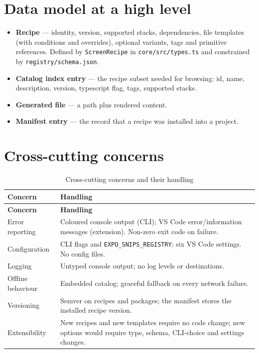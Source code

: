 \section{Data model at a high level}

\begin{itemize}
  \item \textbf{Recipe} --- identity, version, supported stacks, dependencies,
        file templates (with conditions and overrides), optional variants, tags and
        primitive references. Defined by \texttt{ScreenRecipe} in
        \texttt{core/src/types.ts} and constrained by \texttt{registry/schema.json}.
  \item \textbf{Catalog index entry} --- the recipe subset needed for browsing:
        id, name, description, version, typescript flag, tags, supported stacks.
  \item \textbf{Generated file} --- a path plus rendered content.
  \item \textbf{Manifest entry} --- the record that a recipe was installed into a
        project.
\end{itemize}

\section{Cross-cutting concerns}

\begin{longtable}{@{}L{3.6cm}L{10.4cm}@{}}
\caption{Cross-cutting concerns and their handling}\\
\toprule
\textbf{Concern} & \textbf{Handling} \\
\midrule
\endfirsthead
\toprule
\textbf{Concern} & \textbf{Handling} \\
\midrule
\endhead
Error reporting & Coloured console output (CLI); VS Code error/information messages (extension). Non-zero exit code on failure. \\
Configuration & CLI flags and \texttt{EXPO\_SNIPS\_REGISTRY}; six VS Code settings. No config files. \\
Logging & Untyped console output; no log levels or destinations. \\
Offline behaviour & Embedded catalog; graceful fallback on every network failure. \\
Versioning & Semver on recipes and packages; the manifest stores the installed recipe version. \\
Extensibility & New recipes and new templates require no code change; new options would require type, schema, CLI-choice and settings changes. \\
\bottomrule
\end{longtable}

